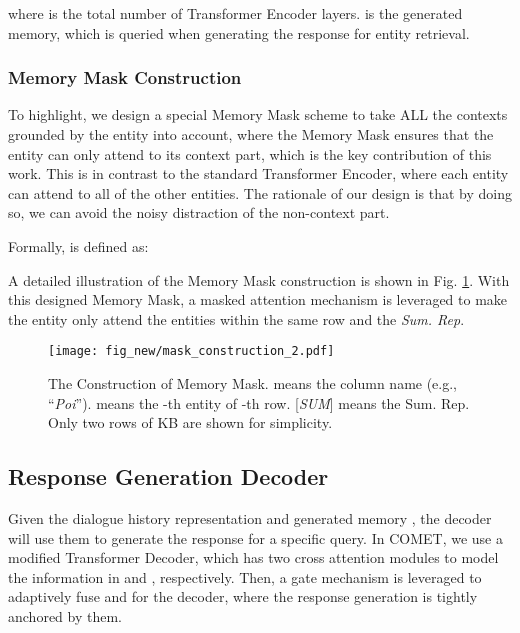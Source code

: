 \documentclass[11pt]{article}
\begin{document}
where  is the total number of Transformer Encoder layers.   is the generated memory, which is queried when generating the response for entity retrieval.


\subsubsection{Memory Mask Construction}
\label{sssec::mem_mask}

To highlight, we design a special Memory Mask scheme to take ALL the contexts grounded by the entity into account, where the Memory Mask ensures that the entity can only attend to its context part, which is the key contribution of this work.
This is in contrast to the standard Transformer Encoder, where each entity can attend to all of the other entities. The rationale of our design is that by doing so, we can avoid the noisy distraction of the non-context part.

Formally,  is defined as:

A detailed illustration of the Memory Mask construction is shown in Fig. \ref{fig::mask_construct}. 
With this designed Memory Mask, a masked attention mechanism is leveraged to make the entity only attend the entities within the same row and the \textit{Sum. Rep}.



\begin{figure}[htb]
\begin{center}
\texttt{[image: fig\_new/mask\_construction\_2.pdf]}
\caption{The Construction of Memory Mask.  means the column name (e.g., ``\textit{Poi}'').  means the -th entity of -th row. {[}\textit{SUM}{]} means the Sum. Rep. Only two rows of KB are shown for simplicity.
}
\label{fig::mask_construct}
\end{center}
\end{figure}




\subsection{Response Generation Decoder}
\label{ssec:decoder}

Given the dialogue history representation  and generated memory , the decoder will use them to generate the response for a specific query. In COMET, we use a modified Transformer Decoder, which has two cross attention modules to model the information in  and , respectively. Then, a gate mechanism is leveraged to adaptively fuse  and  for the decoder, where the response generation is tightly anchored by them.
\end{document}
